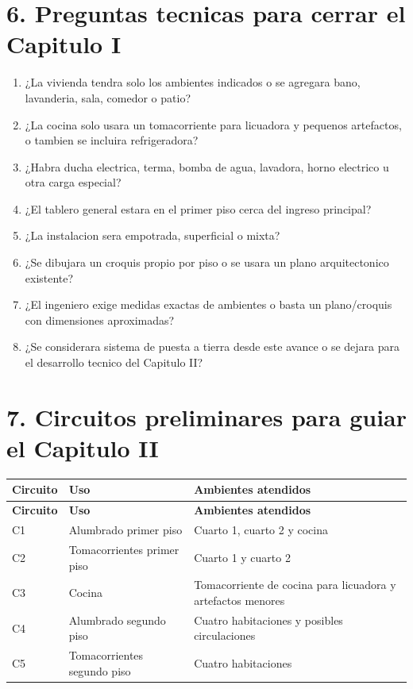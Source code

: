 \documentclass[12pt,a4paper]{article}
\begin{document}
\section*{6. Preguntas tecnicas para cerrar el Capitulo I}

\begin{enumerate}
  \item ¿La vivienda tendra solo los ambientes indicados o se agregara bano, lavanderia, sala, comedor o patio?
  \item ¿La cocina solo usara un tomacorriente para licuadora y pequenos artefactos, o tambien se incluira refrigeradora?
  \item ¿Habra ducha electrica, terma, bomba de agua, lavadora, horno electrico u otra carga especial?
  \item ¿El tablero general estara en el primer piso cerca del ingreso principal?
  \item ¿La instalacion sera empotrada, superficial o mixta?
  \item ¿Se dibujara un croquis propio por piso o se usara un plano arquitectonico existente?
  \item ¿El ingeniero exige medidas exactas de ambientes o basta un plano/croquis con dimensiones aproximadas?
  \item ¿Se considerara sistema de puesta a tierra desde este avance o se dejara para el desarrollo tecnico del Capitulo II?
\end{enumerate}

\section*{7. Circuitos preliminares para guiar el Capitulo II}

\begin{longtable}{L{2.2cm}L{4.5cm}L{6.8cm}}
\toprule
\textbf{Circuito} & \textbf{Uso} & \textbf{Ambientes atendidos} \\
\midrule
\endfirsthead
\toprule
\textbf{Circuito} & \textbf{Uso} & \textbf{Ambientes atendidos} \\
\midrule
\endhead
C1 & Alumbrado primer piso & Cuarto 1, cuarto 2 y cocina \\
C2 & Tomacorrientes primer piso & Cuarto 1 y cuarto 2 \\
C3 & Cocina & Tomacorriente de cocina para licuadora y artefactos menores \\
C4 & Alumbrado segundo piso & Cuatro habitaciones y posibles circulaciones \\
C5 & Tomacorrientes segundo piso & Cuatro habitaciones \\
\bottomrule
\end{longtable}
\end{document}
